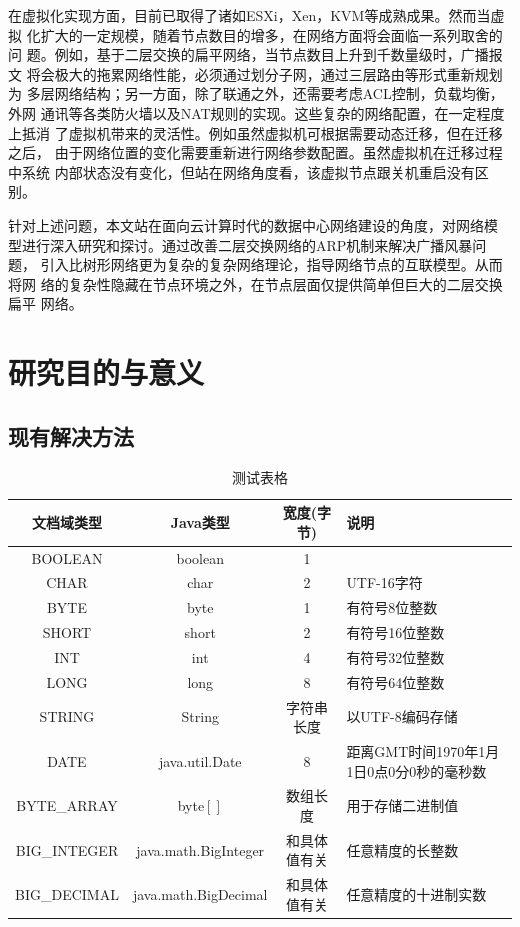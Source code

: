 \documentclass[phd]{jnuthesis}
\begin{document}
在虚拟化实现方面，目前已取得了诸如ESXi，Xen，KVM等成熟成果。然而当虚拟
化扩大的一定规模，随着节点数目的增多，在网络方面将会面临一系列取舍的问
题。例如，基于二层交换的扁平网络，当节点数目上升到千数量级时，广播报文
将会极大的拖累网络性能，必须通过划分子网，通过三层路由等形式重新规划为
多层网络结构；另一方面，除了联通之外，还需要考虑ACL控制，负载均衡，外网
通讯等各类防火墙以及NAT规则的实现。这些复杂的网络配置，在一定程度上抵消
了虚拟机带来的灵活性。例如虽然虚拟机可根据需要动态迁移，但在迁移之后，
由于网络位置的变化需要重新进行网络参数配置。虽然虚拟机在迁移过程中系统
内部状态没有变化，但站在网络角度看，该虚拟节点跟关机重启没有区别。

针对上述问题，本文站在面向云计算时代的数据中心网络建设的角度，对网络模
型进行深入研究和探讨。通过改善二层交换网络的ARP机制来解决广播风暴问题，
引入比树形网络更为复杂的复杂网络理论，指导网络节点的互联模型。从而将网
络的复杂性隐藏在节点环境之外，在节点层面仅提供简单但巨大的二层交换扁平
网络。

\section{研究目的与意义}
\subsection{现有解决方法}
\Blindtext
\begin{table}
  \centering
  \begin{tabular}{cccp{38mm}}
    \toprule
    \textbf{文档域类型} & \textbf{Java类型} & \textbf{宽度(字节)} & \textbf{说明} \\
    \midrule
    BOOLEAN  & boolean &  1  & \\
    CHAR     & char    &  2  & UTF-16字符 \\
    BYTE     & byte    &  1  & 有符号8位整数 \\
    SHORT    & short   &  2  & 有符号16位整数 \\
    INT      & int     &  4  & 有符号32位整数 \\
    LONG     & long    &  8  & 有符号64位整数 \\
    STRING   & String  &  字符串长度  & 以UTF-8编码存储 \\
    DATE     & java.util.Date & 8 & 距离GMT时间1970年1月1日0点0分0秒的毫秒数 \\
    BYTE\_ARRAY & byte$[]$ & 数组长度 & 用于存储二进制值 \\
    BIG\_INTEGER & java.math.BigInteger & 和具体值有关 & 任意精度的长整数 \\
    BIG\_DECIMAL & java.math.BigDecimal & 和具体值有关 & 任意精度的十进制实数 \\
    \bottomrule
  \end{tabular}
  \caption{测试表格}\label{table:test1}
\end{table}
\Blindtext
\end{document}
